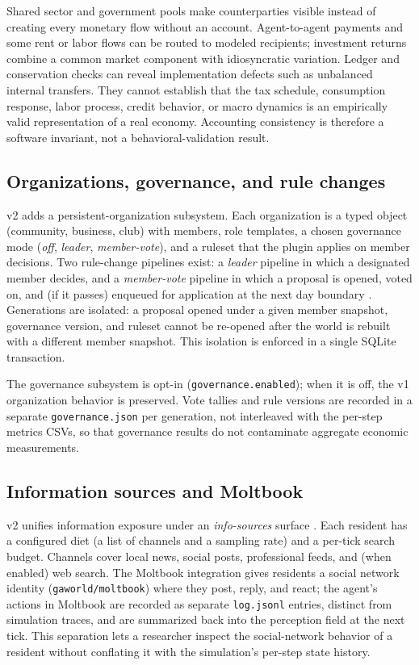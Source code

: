 Shared sector and government pools make counterparties visible instead of
creating every monetary flow without an account.  Agent-to-agent payments
and some rent or labor flows can be routed to modeled recipients;
investment returns combine a common market component with idiosyncratic
variation.  Ledger and conservation checks can reveal implementation defects
such as unbalanced internal transfers.  They cannot establish that the tax
schedule, consumption response, labor process, credit behavior, or macro
dynamics is an empirically valid representation of a real economy.
Accounting consistency is therefore a software invariant, not a
behavioral-validation result.

\subsection{Organizations, governance, and rule changes}

v2 adds a persistent-organization subsystem.  Each organization is a
typed object (community, business, club) with members, role templates, a
chosen governance mode (\emph{off}, \emph{leader}, \emph{member-vote}), and
a ruleset that the plugin applies on member decisions.  Two rule-change
pipelines exist: a \emph{leader} pipeline in which a designated member
decides, and a \emph{member-vote} pipeline in which a proposal is opened,
voted on, and (if it passes) enqueued for application at the next day
boundary \citep{gaworldgovernance}.  Generations are isolated: a proposal
opened under a given member snapshot, governance version, and ruleset cannot
be re-opened after the world is rebuilt with a different member snapshot.
This isolation is enforced in a single SQLite transaction.

The governance subsystem is opt-in (\texttt{governance.enabled}); when it is
off, the v1 organization behavior is preserved.  Vote tallies and rule
versions are recorded in a separate \texttt{governance.json} per generation,
not interleaved with the per-step metrics CSVs, so that governance results
do not contaminate aggregate economic measurements.

\subsection{Information sources and Moltbook}

v2 unifies information exposure under an \emph{info-sources} surface
\citep{gaworldrag}.  Each resident has a configured diet (a list of
channels and a sampling rate) and a per-tick search budget.  Channels cover
local news, social posts, professional feeds, and (when enabled) web
search.  The Moltbook integration gives residents a social network identity
(\texttt{gaworld/moltbook}) where they post, reply, and react; the agent's
actions in Moltbook are recorded as separate \texttt{log.jsonl} entries,
distinct from simulation traces, and are summarized back into the perception
field at the next tick.  This separation lets a researcher inspect the
social-network behavior of a resident without conflating it with the
simulation's per-step state history.

